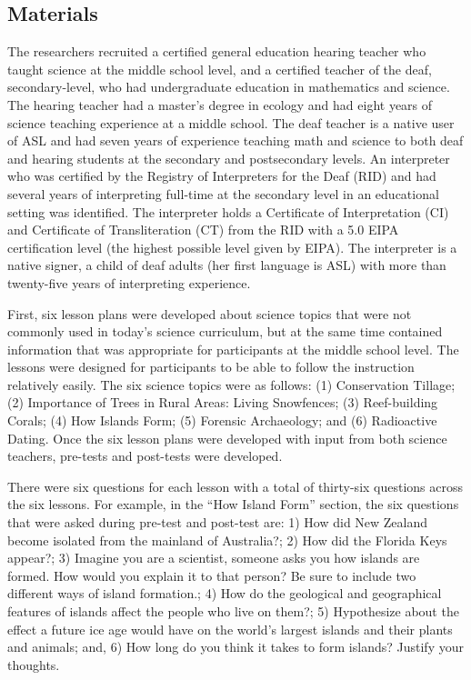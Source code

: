 \documentclass[11.5pt]{sig-alternate} %
\begin{document}
\begin{large}
\subsection*{Materials}

The researchers recruited a certified general education hearing teacher who taught science at the middle school level, and a certified teacher of the deaf, secondary-level, who had undergraduate education in mathematics and science. The hearing teacher had a master’s degree in ecology and had eight years of science teaching experience at a middle school. The deaf teacher is a native user of ASL and had seven years of experience teaching math and science to both deaf and hearing students at the secondary and postsecondary levels. An interpreter who was certified by the Registry of Interpreters for the Deaf (RID) and had several years of interpreting full-time at the secondary level in an educational setting was identified. The interpreter holds a Certificate of Interpretation (CI) and Certificate of Transliteration (CT) from the RID with a 5.0 EIPA certification level (the highest possible level given by EIPA). The interpreter is a native signer, a child of deaf adults (her first language is ASL) with more than twenty-five years of interpreting experience.

First, six lesson plans were developed about science topics that were not commonly used in today’s science curriculum, but at the same time contained information that was appropriate for participants at the middle school level. The lessons were designed for participants to be able to follow the instruction relatively easily. The six science topics were as follows: (1) Conservation Tillage; (2) Importance of Trees in Rural Areas: Living Snowfences; (3) Reef-building Corals; (4) How Islands Form; (5) Forensic Archaeology; and (6) Radioactive Dating. Once the six lesson plans were developed with input from both science teachers, pre-tests and post-tests were developed.

There were six questions for each lesson with a total of thirty-six questions across the six lessons. For example, in the “How Island Form” section, the six questions that were asked during pre-test and post-test are: 1) How did New Zealand become isolated from the mainland of Australia?; 2) How did the Florida Keys appear?; 3) Imagine you are a scientist, someone asks you how islands are formed. How would you explain it to that person? Be sure to include two different ways of island formation.; 4) How do the geological and geographical features of islands affect the people who live on them?; 5) Hypothesize about the effect a future ice age would have on the world’s largest islands and their plants and animals; and, 6) How long do you think it takes to form islands? Justify your thoughts.  


\end{large}
\end{document}
